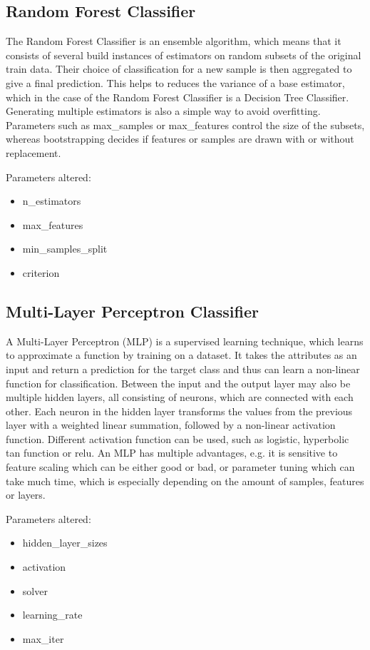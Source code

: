 \documentclass{article}
\begin{document}
\subsection{Random Forest Classifier}
The Random Forest Classifier is an ensemble algorithm, which means that it consists of several build instances of estimators on random subsets of the original train data. Their choice of classification for a new sample is then aggregated to give a final prediction. This helps to reduces the variance of a base estimator, which in the case of the Random Forest Classifier is a Decision Tree Classifier. Generating multiple estimators is also a simple way to avoid overfitting. Parameters such as max\_samples or max\_features control the size of the subsets, whereas bootstrapping decides if features or samples are drawn with or without replacement.

Parameters altered:
\begin{itemize}
\item n\_estimators
\item max\_features
\item min\_samples\_split
\item criterion
\end{itemize}

\subsection{Multi-Layer Perceptron Classifier}
A Multi-Layer Perceptron (MLP) is a supervised learning technique, which learns to approximate a function
by training on a dataset. It takes the attributes as an input and return a prediction for the target class and thus can learn a non-linear function for classification. Between the input and the output layer may also be multiple hidden layers, all consisting of neurons, which are connected with each other. Each neuron in the hidden layer transforms the values from the previous layer with a weighted linear summation, followed by a non-linear activation function. Different activation function can be used, such as logistic, hyperbolic tan function or relu. An MLP has multiple advantages, e.g. it is sensitive to feature scaling which can be either good or bad, or parameter tuning which can take much time, which is especially depending on the amount of samples, features or layers.

Parameters altered:
\begin{itemize}
\item hidden\_layer\_sizes
\item activation
\item solver
\item learning\_rate
\item max\_iter
\end{itemize}
\end{document}

